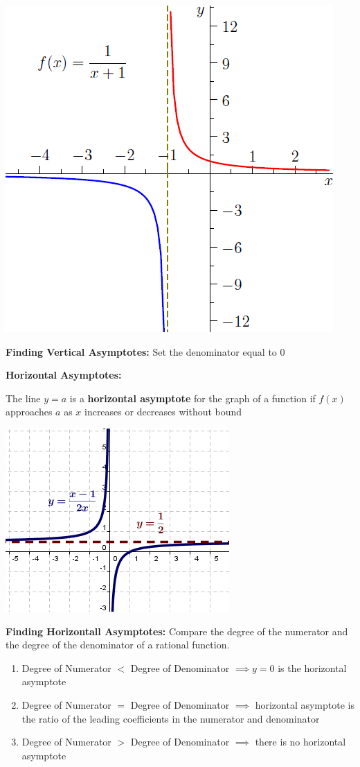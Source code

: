 \documentclass[12pt]{article}
\begin{document}
\centerline{\includegraphics[scale = 0.5]{VerticalAsymptote.png}}

\textbf{Finding Vertical Asymptotes:} Set the denominator equal to $0$

\textbf{Horizontal Asymptotes:} 

The line $y = a$ is a \textbf{horizontal asymptote} for the graph of a function if $f(x)$ approaches $a$ as $x$ increases or decreases without bound

\centerline{\includegraphics[scale = 0.7]{HorizontalAsymptote.png}}

\textbf{Finding Horizontall Asymptotes:} Compare the degree of the numerator and the degree of the denominator of a rational function. 

\begin{enumerate}
\item Degree of Numerator $<$ Degree of Denominator $\implies y = 0$ is the horizontal asymptote
\item Degree of Numerator $=$ Degree of Denominator $\implies$ horizontal asymptote is the ratio of the leading coefficients in the numerator and denominator
\item Degree of Numerator $>$ Degree of Denominator $\implies$ there is no horizontal asymptote
\end{enumerate}
\end{document}
